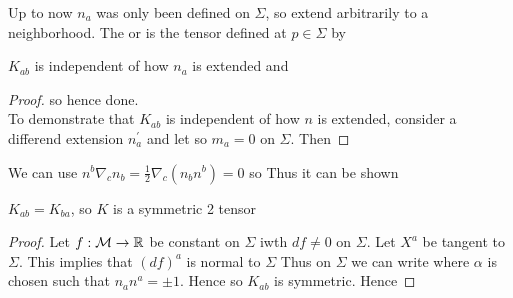 \documentclass{article}
\begin{document}
\begin{definition}
Up to now $n_a$ was only been defined on $\Sigma$, so extend arbitrarily to a neighborhood. The  or  is the tensor defined at $p\in\Sigma$ by
\end{definition}

\begin{lemma}
$K_{ab}$ is independent of how $n_a$ is extended and 
\end{lemma}
\begin{proof}
so 
hence done. \\
To demonstrate that $K_{ab}$ is independent of how $n$ is extended, consider a differend extension $n_a^\prime$ and let 
so $m_a=0$ on $\Sigma$. Then 
\end{proof}
We can use $n^b\nabla_c n_b = \frac{1}{2} \nabla_c (n_b n^b) = 0 $ so 
Thus it can be shown 

\begin{lemma}
$K_{ab}=K_{ba}$, so $K$ is a symmetric 2 tensor
\end{lemma}
\begin{proof}
Let $f:\mathcal{M} \to \mathbb{R}$ be constant on $\Sigma$ iwth $df \neq 0$ on $\Sigma$. Let $X^a$ be tangent to $\Sigma$. 
This implies that $(df)^a$ is normal to $\Sigma$
Thus on $\Sigma$ we can write 
where $\alpha$ is chosen such that $n_a n^a = \pm1$. Hence 
so $K_{ab}$ is symmetric. Hence 
\end{proof}

\end{document}
